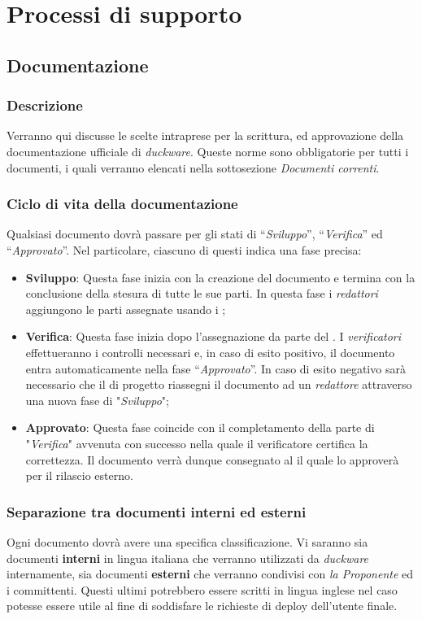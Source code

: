 \clearpage
\section{Processi di supporto}
\label{sec:proc_supp}
\subsection{Documentazione}
\label{sec:documentazione}
\subsubsection{Descrizione}
Verranno qui discusse le scelte intraprese per la scrittura,  ed approvazione della documentazione ufficiale di \emph{duckware}. Queste norme sono obbligatorie per tutti i documenti, i quali verranno elencati nella sottosezione \emph{Documenti correnti}.
\subsubsection{Ciclo di vita della documentazione}
Qualsiasi documento dovrà passare per gli stati di “\emph{Sviluppo}”, “\emph{Verifica}” ed “\emph{Approvato}”. Nel particolare, ciascuno di questi indica una fase precisa:
\begin{itemize}
    \item \textbf{Sviluppo}: Questa fase inizia con la creazione del documento e termina con la conclusione della stesura di tutte le sue parti. In questa fase i \emph{redattori} aggiungono le parti assegnate usando i ;
    \item \textbf{Verifica}: Questa fase inizia dopo l’assegnazione da parte del \emph{}. I \emph{verificatori} effettueranno i controlli necessari e, in caso di esito positivo, il documento entra automaticamente nella fase “\emph{Approvato}”. In caso di esito negativo sarà necessario che il \emph{} di progetto riassegni il documento ad un \emph{redattore} attraverso una nuova fase di "\emph{Sviluppo}";
    \item \textbf{Approvato}: Questa fase coincide con il completamento della parte di "\emph{Verifica}" avvenuta con successo nella quale il verificatore certifica la correttezza. Il documento verrà dunque consegnato al \emph{} il quale lo approverà per il rilascio esterno.
\end{itemize}

\subsubsection{Separazione tra documenti interni ed esterni}
Ogni documento dovrà avere una specifica classificazione. Vi saranno sia documenti \textbf{interni} in lingua italiana che verranno utilizzati da \emph{duckware} internamente, sia documenti \textbf{esterni} che verranno condivisi con \emph{la Proponente} ed i committenti. Questi ultimi potrebbero essere scritti in lingua inglese nel caso potesse essere utile al fine di soddisfare le richieste di deploy dell’utente finale.

